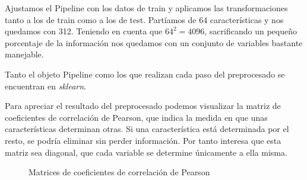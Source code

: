 \documentclass[a4]{article}
\begin{document}
Ajustamos el Pipeline con los datos de train y aplicamos las
transformaciones tanto a los de train como a los de test. Partíamos de
64 características y nos quedamos con 312. Teniendo en cuenta que
$64^2=4096$, sacrificando un pequeño porcentaje de la información
nos quedamos con un conjunto de variables bastante manejable.

Tanto el objeto Pipeline como los que realizan cada paso del
preprocesado se encuentran en \textit{sklearn}.

Para apreciar el resultado del preprocesado podemos visualizar la
matriz de coeficientes de correlación de Pearson, que indica la medida
en que unas características determinan otras. Si una característica
está determinada por el resto, se podría eliminar sin perder
información. Por tanto interesa que esta matriz sea diagonal, que cada
variable se determine únicamente a ella misma.

\vspace{-4mm}
\begin{figure}[H]
  \centering
  \caption{Matrices de coeficientes de correlación de Pearson}
  \label{fig:pearson}
\end{figure}
\vspace{-4mm}
\end{document}
